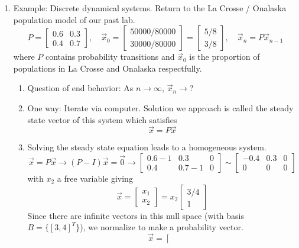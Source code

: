\documentclass{article}
\begin{document}
\begin{enumerate}

\item Example: Discrete dynamical systems. Return to the La Crosse / Onalaska population model of our past lab.
\[
P = \left[
\begin{array}{cc}
0.6 & 0.3 \\
0.4 & 0.7
\end{array}
\right], \quad 
\vec{x}_0 = \left[
\begin{array}{c}
50000/80000 \\ 30000/80000
\end{array}
\right]
= \left[
\begin{array}{c}
5/8 \\ 3/8
\end{array}
\right], \quad
\vec{x}_n = P \vec{x}_{n-1}
\]
where $P$ contains probability transitions and $\vec{x}_0$ is the proportion of populations in La Crosse and Onalaska respectfully. 
\begin{enumerate}
\item Question of end behavior: As $n\rightarrow \infty$, $\vec{x}_n \rightarrow $?
\item One way: Iterate via computer. Solution we approach is called the steady state vector of this system which satisfies
\[
\vec{x} = P \vec{x}
\]
\item Solving the steady state equation leads to a homogeneous system.
\[
\vec{x} = P \vec{x} \rightarrow (P-I)\vec{x} = \vec{0} \rightarrow 
\left[
\begin{array}{cc|c}
0.6-1 & 0.3 & 0 \\
0.4 & 0.7-1 & 0
\end{array}
\right] \sim
\left[
\begin{array}{cc|c}
-0.4 & 0.3 & 0 \\
0 & 0 & 0
\end{array}
\right]
\]
with $x_2$ a free variable giving
\[
\vec{x} = \left[
\begin{array}{c}
x_1 \\ x_2
\end{array}
\right]
= x_2\left[
\begin{array}{c}
3/4 \\ 1
\end{array}
\right]
\]
Since there are infinite vectors in this null space (with basis $B = \{ [3,4]^T \}$), we normalize to make a probability vector.
\[
\vec{x} = \left[
\begin{array}{c}

\end{array}\]
\end{enumerate}
\end{enumerate}
\end{document}
